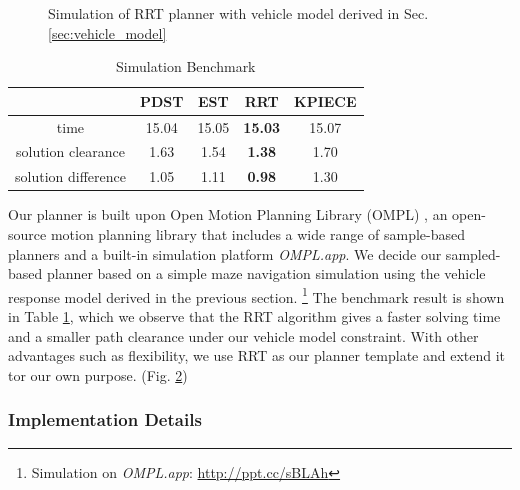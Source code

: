 \documentclass[../thesis.tex]{subfiles}
\begin{document}
\begin{figure}[t]
\begin{subfigure}[b]{0.3\linewidth}
		\subcaption{}
		\label{fig:rrt-sim-maze2}
	\end{subfigure}
	\caption{Simulation of RRT planner with vehicle model derived in Sec. \ref{sec:vehicle_model}}
    \label{fig:rrt-sim-maze}
\end{figure}


\begin{table}[t]
	\centering
	\caption{Simulation Benchmark}
	\label{table:simulation-benchmark}
	\begin{small}
	\begin{sc}
	\begin{tabular}{ccccc}
		\toprule 
			& PDST \cite{ladd2005motion} & EST \cite{hsu1997path} & RRT \cite{kuffner2000rrt} & KPIECE \cite{csucan2009kinodynamic} \\
		\midrule \midrule
		time & 15.04 & 15.05 & \textbf{15.03} & 15.07 \\
		solution clearance & 1.63 & 1.54 & \textbf{1.38} & 1.70 \\
		solution difference & 1.05 & 1.11 & \textbf{0.98} & 1.30 \\
		\toprule
	\end{tabular}
	\end{sc}
	\end{small}
\end{table}

Our planner is built upon Open Motion Planning Library (OMPL) \cite{sucan2012the-open-motion-planning-library}, an open-source motion planning library that includes a wide range of sample-based planners and a built-in simulation platform \textit{OMPL.app}. We decide our sampled-based planner based on a simple maze navigation simulation using the vehicle response model derived in the previous section. \footnote{Simulation on \textit{OMPL.app}: \url{http://ppt.cc/sBLAh}} The benchmark result is shown in Table \ref{table:simulation-benchmark}, which we observe that the RRT algorithm gives a faster solving time and a smaller path clearance under our vehicle model constraint. With other advantages such as flexibility, we use RRT as our planner template and extend it tor our own purpose. (Fig. \ref{fig:rrt-sim-maze})


\subsubsection{Implementation Details}
\end{document}
